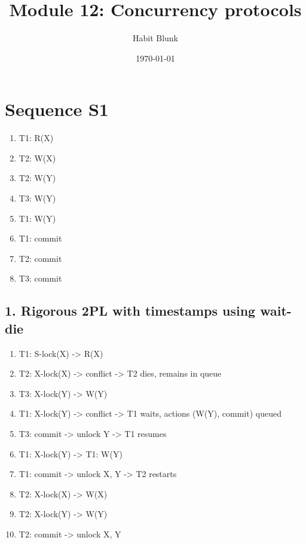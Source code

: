 \documentclass[fleqn]{article}
\title{Module 12: Concurrency protocols}
\author{Habit Blunk}
\date{\today}
\begin{document}
\maketitle

\section*{Sequence S1}
  \begin{enumerate}
    \item T1: R(X)
    \item T2: W(X)
    \item T2: W(Y)
    \item T3: W(Y)
    \item T1: W(Y)
    \item T1: commit
    \item T2: commit
    \item T3: commit
  \end{enumerate}


  \subsection*{1. Rigorous 2PL with timestamps using wait-die}
  \begin{enumerate}
    \item T1: S-lock(X) -> R(X)
    \item T2: X-lock(X) -> conflict -> T2 dies, remains in queue
    \item T3: X-lock(Y) -> W(Y)
    \item T1: X-lock(Y) -> conflict -> T1 waits, actions (W(Y), commit) queued
    \item T3: commit -> unlock Y -> T1 resumes
    \item T1: X-lock(Y) -> T1: W(Y)
    \item T1: commit -> unlock X, Y -> T2 restarts
    \item T2: X-lock(X) -> W(X)
    \item T2: X-lock(Y) -> W(Y)
    \item T2: commit -> unlock X, Y
  \end{enumerate}
\end{document}
